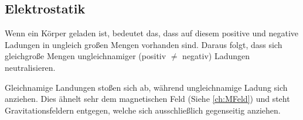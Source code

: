 




%
%	





\subsection{Elektrostatik}

Wenn ein Körper geladen ist, bedeutet das, dass auf diesem positive und negative Ladungen in ungleich großen Mengen vorhanden sind. Daraus folgt, dass sich gleichgroße Mengen ungleichnamiger (positiv $\neq$ negativ) Ladungen neutralisieren.

Gleichnamige Landungen stoßen sich ab, während ungleichnamige Ladung sich anziehen. Dies ähnelt sehr dem magnetischen Feld (Siehe \ref{ch:MFeld}) und steht Gravitationsfeldern entgegen, welche sich ausschließlich gegenseitig anziehen.

